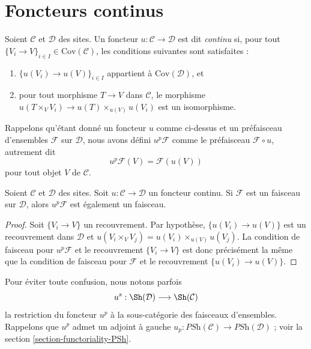 \section{Foncteurs continus}
\label{section-continuous-functors}

\begin{definition}
\label{definition-continuous}
Soient $\mathcal{C}$ et $\mathcal{D}$ des sites.
Un foncteur $u : \mathcal{C} \to \mathcal{D}$ est dit
{\it continu} si, pour tout
$\{V_i \to V\}_{i\in I} \in \text{Cov}(\mathcal{C})$,
les conditions suivantes sont satisfaites :
\begin{enumerate}
\item $\{u(V_i) \to u(V)\}_{i\in I}$ appartient à $\text{Cov}(\mathcal{D})$, et
\item pour tout morphisme $T \to V$ dans $\mathcal{C}$, le morphisme
$u(T \times_V V_i) \to u(T) \times_{u(V)} u(V_i)$ est un isomorphisme.
\end{enumerate}
\end{definition}

\noindent
Rappelons qu’étant donné un foncteur $u$ comme ci-dessus et un préfaisceau d’ensembles
$\mathcal{F}$ sur $\mathcal{D}$, nous avons défini
$u^p\mathcal{F}$ comme le préfaisceau
$\mathcal{F} \circ u$, autrement dit
$$
u^p\mathcal{F} (V) = \mathcal{F}(u(V))
$$
pour tout objet $V$ de $\mathcal{C}$.

\begin{lemma}
\label{lemma-pushforward-sheaf}
Soient $\mathcal{C}$ et $\mathcal{D}$ des sites.
Soit $u : \mathcal{C} \to \mathcal{D}$ un foncteur continu.
Si $\mathcal{F}$ est un faisceau sur $\mathcal{D}$, alors
$u^p\mathcal{F}$ est également un faisceau.
\end{lemma}

\begin{proof}
Soit $\{V_i \to V\}$ un recouvrement.
Par hypothèse, $\{u(V_i) \to u(V)\}$ est un recouvrement
dans $\mathcal{D}$ et $u(V_i \times_V V_j) =
u(V_i)\times_{u(V)}u(V_j)$. La condition de faisceau pour
$u^p\mathcal{F}$ et le recouvrement $\{V_i \to V\}$
est donc précisément la même que la condition de faisceau pour $\mathcal{F}$
et le recouvrement $\{u(V_i) \to u(V)\}$.
\end{proof}

\noindent
Pour éviter toute confusion, nous notons parfois
$$
u^s :
\Sh(\mathcal{D})
\longrightarrow
\Sh(\mathcal{C})
$$
la restriction du foncteur $u^p$ à la sous-catégorie des faisceaux d’ensembles.
Rappelons que $u^p$ admet un adjoint à gauche
$u_p : \textit{PSh}(\mathcal{C}) \to \textit{PSh}(\mathcal{D})$ ; voir
la section \ref{section-functoriality-PSh}.

